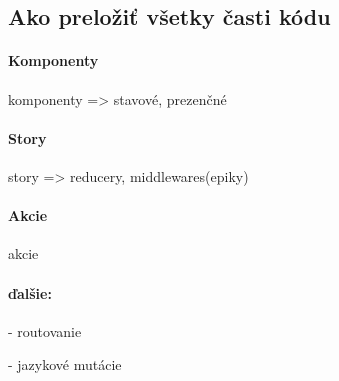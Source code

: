 \subsection{Ako preložiť všetky časti kódu}

\paragraph{Komponenty}
komponenty => stavové, prezenčné

\paragraph{Story}
story => reducery, middlewares(epiky)

\paragraph{Akcie}
akcie

\paragraph{ďalšie:}
- routovanie

- jazykové mutácie